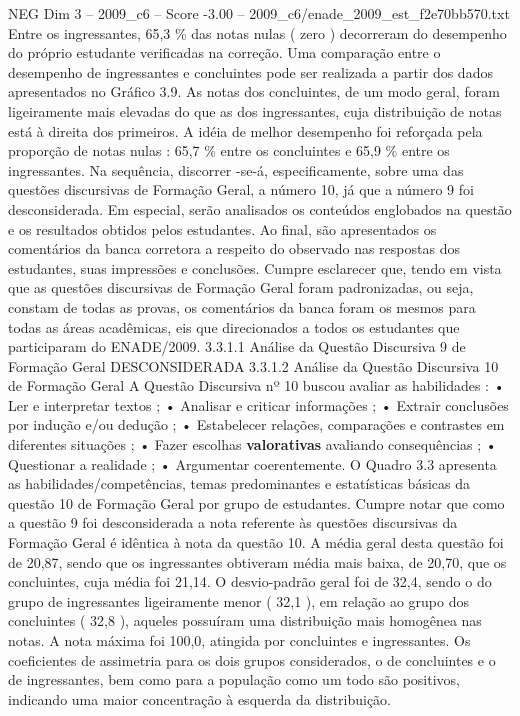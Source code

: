 \begin{textsample}{NEG Dim 3 – 2009\_c6 – Score -3.00 – 2009\_c6/enade\_2009\_est\_f2e70bb570.txt}
Entre os ingressantes, 65,3 \% das notas nulas ( zero ) decorreram do desempenho do próprio estudante verificadas na correção.
Uma comparação entre o desempenho de ingressantes e concluintes pode ser realizada a partir dos dados apresentados no Gráfico 3.9.
As notas dos concluintes, de um modo geral, foram ligeiramente mais elevadas do que as dos ingressantes, cuja distribuição de notas está à direita dos primeiros.
A idéia de melhor desempenho foi reforçada pela proporção de notas nulas : 65,7 \% entre os concluintes e 65,9 \% entre os ingressantes.
Na sequência, discorrer -se-á, especificamente, sobre uma das questões discursivas de Formação Geral, a número 10, já que a número 9 foi desconsiderada.
Em especial, serão analisados os conteúdos englobados na questão e os resultados obtidos pelos estudantes.
Ao final, são apresentados os comentários da banca corretora a respeito do observado nas respostas dos estudantes, suas impressões e conclusões.
Cumpre esclarecer que, tendo em vista que as questões discursivas de Formação Geral foram padronizadas, ou seja, constam de todas as provas, os comentários da banca foram os mesmos para todas as áreas acadêmicas, eis que direcionados a todos os estudantes que participaram do ENADE/2009. 3.3.1.1 Análise da Questão Discursiva 9 de Formação Geral DESCONSIDERADA 3.3.1.2 Análise da Questão Discursiva 10 de Formação Geral A Questão Discursiva nº 10 buscou avaliar as habilidades : • Ler e interpretar textos ; • Analisar e criticar informações ; • Extrair conclusões por indução e/ou dedução ; • Estabelecer relações, comparações e contrastes em diferentes situações ; • Fazer escolhas \textbf{valorativas} avaliando consequências ; • Questionar a realidade ; • Argumentar coerentemente.
O Quadro 3.3 apresenta as habilidades/competências, temas predominantes e estatísticas básicas da questão 10 de Formação Geral por grupo de estudantes.
Cumpre notar que como a questão 9 foi desconsiderada a nota referente às questões discursivas da Formação Geral é idêntica à nota da questão 10.
A média geral desta questão foi de 20,87, sendo que os ingressantes obtiveram média mais baixa, de 20,70, que os concluintes, cuja média foi 21,14.
O desvio-padrão geral foi de 32,4, sendo o do grupo de ingressantes ligeiramente menor ( 32,1 ), em relação ao grupo dos concluintes ( 32,8 ), aqueles possuíram uma distribuição mais homogênea nas notas.
A nota máxima foi 100,0, atingida por concluintes e ingressantes.
Os coeficientes de assimetria para os dois grupos considerados, o de concluintes e o de ingressantes, bem como para a população como um todo são positivos, indicando uma maior concentração à esquerda da distribuição.

\end{textsample}
